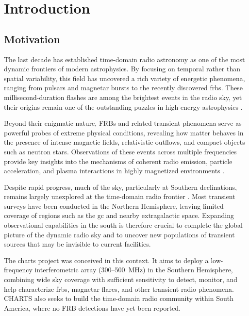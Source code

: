 \chapter{Introduction}

\section{Motivation}
The last decade has established time-domain radio astronomy as one of the most dynamic frontiers of modern astrophysics. By focusing on temporal rather than spatial variability, this field has uncovered a rich variety of energetic phenomena, ranging from pulsars and magnetar bursts to the recently discovered \glspl{frb}. These millisecond-duration flashes are among the brightest events in the radio sky, yet their origins remain one of the outstanding puzzles in high-energy astrophysics \citep{Petroff_2019}.

Beyond their enigmatic nature, FRBs and related transient phenomena serve as powerful probes of extreme physical conditions, revealing how matter behaves in the presence of intense magnetic fields, relativistic outflows, and compact objects such as neutron stars. Observations of these events across multiple frequencies provide key insights into the mechanisms of coherent radio emission, particle acceleration, and plasma interactions in highly magnetized environments \citep{EmissionMechanisms2022}.

Despite rapid progress, much of the sky, particularly at Southern declinations, remains largely unexplored at the time-domain radio frontier \citep{fender2024fillingradiotransientsgap}. Most transient surveys have been conducted in the Northern Hemisphere, leaving limited coverage of regions such as the \gls{gc} and nearby extragalactic space. Expanding observational capabilities in the south is therefore crucial to complete the global picture of the dynamic radio sky and to uncover new populations of transient sources that may be invisible to current facilities.

The \gls{charts} project was conceived in this context. It aims to deploy a low-frequency interferometric array (300--500~MHz) in the Southern Hemisphere, combining wide sky coverage with sufficient sensitivity to detect, monitor, and help characterize \glspl{frb}, magnetar flares, and other transient radio phenomena. CHARTS also seeks to build the time-domain radio community within South America, where no FRB detections have yet been reported.

